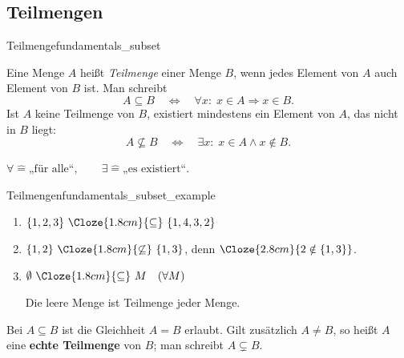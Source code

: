 \subsection{Teilmengen}
\label{subsec:fundamentals_subsets}

\begin{DefinitionBox}{Teilmenge}{fundamentals_subset}
  \begin{minipage}[t]{0.62\linewidth}
    \vspace{0pt}
    Eine Menge $A$ heißt \emph{Teilmenge}  einer Menge
    $B$, wenn jedes Element von $A$ auch Element von $B$ ist. Man schreibt
    \[
      A\subseteq B
      \quad\Longleftrightarrow\quad
      \forall x:\; x\in A\Rightarrow x\in B.
    \]
    Ist $A$ keine Teilmenge von $B$, existiert mindestens ein Element von $A$,
    das nicht in $B$ liegt:
    \[
      A\not\subseteq B
      \quad\Longleftrightarrow\quad
      \exists x:\; x\in A\land x\notin B.
    \]
  \end{minipage}\hfill
  \begin{minipage}[t]{0.32\linewidth}
    \vspace{0pt}
    \centering
  \end{minipage}
  \par\smallskip
  \hfill
  {\footnotesize\color{black!55}
    $\forall\mathrel{\widehat{=}}\text{„für alle“},\qquad
     \exists\mathrel{\widehat{=}}\text{„es existiert“}$.}
\end{DefinitionBox}

\begin{ExampleBox}[after skip=0pt]{Teilmengen}{fundamentals_subset_example}
  \begin{enumerate}[label=\alph*),itemsep=0.6em]
    \item $\{1,2,3\}\ \Cloze{1.8cm}{\subseteq}\ \{1,4,3,2\}$
    \item $\{1,2\}\ \Cloze{1.8cm}{\not\subseteq}\ \{1,3\}$,
      denn $\Cloze{2.8cm}{2\notin\{1,3\}}$.
    \item $\emptyset\ \Cloze{1.8cm}{\subseteq}\ M\quad(\forall M)$
    \par\smallskip
    Die leere Menge ist Teilmenge jeder Menge.
  \end{enumerate}
\end{ExampleBox}

\par\nobreak
\begin{RemarkBox}[remark title=Echte Teilmengen,before skip=0.35\baselineskip]
  Bei $A\subseteq B$ ist die Gleichheit $A=B$ erlaubt. Gilt zusätzlich
  $A\neq B$, so heißt $A$ eine \textbf{echte Teilmenge}
   von $B$; man schreibt $A\subsetneq B$.
\end{RemarkBox}
